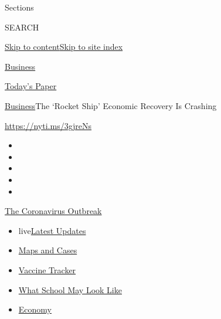 Sections

SEARCH

\protect\hyperlink{site-content}{Skip to
content}\protect\hyperlink{site-index}{Skip to site index}

\href{https://www.nytimes.com/section/business}{Business}

\href{https://myaccount.nytimes.com/auth/login?response_type=cookie\&client_id=vi}{}

\href{https://www.nytimes.com/section/todayspaper}{Today's Paper}

\href{/section/business}{Business}\textbar{}The `Rocket Ship' Economic
Recovery Is Crashing

\url{https://nyti.ms/3gjreNs}

\begin{itemize}
\item
\item
\item
\item
\item
\end{itemize}

\href{https://www.nytimes.com/news-event/coronavirus?action=click\&pgtype=Article\&state=default\&region=TOP_BANNER\&context=storylines_menu}{The
Coronavirus Outbreak}

\begin{itemize}
\tightlist
\item
  live\href{https://www.nytimes.com/2020/08/01/world/coronavirus-covid-19.html?action=click\&pgtype=Article\&state=default\&region=TOP_BANNER\&context=storylines_menu}{Latest
  Updates}
\item
  \href{https://www.nytimes.com/interactive/2020/us/coronavirus-us-cases.html?action=click\&pgtype=Article\&state=default\&region=TOP_BANNER\&context=storylines_menu}{Maps
  and Cases}
\item
  \href{https://www.nytimes.com/interactive/2020/science/coronavirus-vaccine-tracker.html?action=click\&pgtype=Article\&state=default\&region=TOP_BANNER\&context=storylines_menu}{Vaccine
  Tracker}
\item
  \href{https://www.nytimes.com/interactive/2020/07/29/us/schools-reopening-coronavirus.html?action=click\&pgtype=Article\&state=default\&region=TOP_BANNER\&context=storylines_menu}{What
  School May Look Like}
\item
  \href{https://www.nytimes.com/live/2020/07/31/business/stock-market-today-coronavirus?action=click\&pgtype=Article\&state=default\&region=TOP_BANNER\&context=storylines_menu}{Economy}
\end{itemize}


